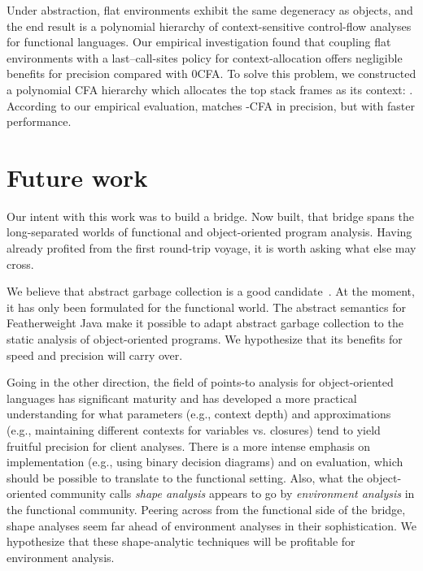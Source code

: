 Under abstraction, flat environments exhibit the same degeneracy as
objects, and the end result is a polynomial hierarchy of
context-sensitive control-flow analyses for functional languages.
Our empirical investigation found that coupling flat environments with
a last--call-sites policy for context-allocation offers negligible
benefits for precision compared with 0CFA.
To solve this problem, we constructed a polynomial CFA hierarchy which
allocates the top  stack frames as its context: \nCFA{}.
According to our empirical evaluation, \nCFA{} matches -CFA in
precision, but with faster performance.


\section{Future work}
\label{sec:future}

Our intent with this work was to build a bridge.
Now built, that bridge spans the long-separated worlds of
functional and object-oriented program analysis.
Having already profited from the first round-trip voyage, it is worth asking what else
may cross.

We believe that abstract garbage collection is a good candidate~\cite{mattmight:Might:2006:GammaCFA}.
At the moment, it has only been formulated for the functional world.
The abstract semantics for Featherweight Java make it possible to
adapt abstract garbage collection to the static analysis of
object-oriented programs.
We hypothesize that its benefits for speed and precision will carry
over.

Going in the other direction, the field of points-to analysis for
object-oriented languages has significant maturity and has developed a
more practical understanding for what parameters (e.g., context depth)
and approximations (e.g., maintaining different contexts for variables
vs. closures) tend to yield fruitful precision for client analyses.
There is a more intense emphasis on implementation (e.g., using binary
decision diagrams) and on evaluation, which should
be possible to translate to the functional setting.
Also, what the object-oriented community calls
\emph{shape analysis} appears to go by \emph{environment analysis} in
the functional community.
Peering across from the functional side of the bridge, shape analyses
seem far ahead of environment analyses in their sophistication.
We hypothesize that these shape-analytic techniques will be profitable
for environment analysis.




